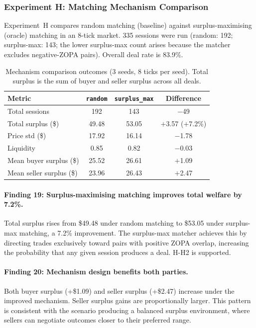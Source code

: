 \subsubsection{Experiment H: Matching Mechanism Comparison}
\label{sec:results-mechanism}

Experiment~H compares random matching (baseline) against surplus-maximising (oracle) matching in an 8-tick market.  335 sessions were run (random: 192; surplus-max: 143; the lower surplus-max count arises because the matcher excludes negative-ZOPA pairs).  Overall deal rate is 83.9\%.

\begin{table}[ht]
\centering
\caption{Mechanism comparison outcomes (3 seeds, 8 ticks per seed).  Total surplus is the sum of buyer and seller surplus across all deals.}
\label{tab:mechanism}
\begin{tabular}{@{}lccc@{}}
\toprule
Metric & \texttt{random} & \texttt{surplus\_max} & Difference \\
\midrule
Total sessions           & 192     & 143     & $-$49 \\
Total surplus (\$)       & 49.48   & 53.05   & $+$3.57 ($+$7.2\%) \\
Price std (\$)           & 17.92   & 16.14   & $-$1.78 \\
Liquidity                & 0.85    & 0.82    & $-$0.03 \\
Mean buyer surplus (\$)  & 25.52   & 26.61   & $+$1.09 \\
Mean seller surplus (\$) & 23.96   & 26.43   & $+$2.47 \\
\bottomrule
\end{tabular}
\end{table}

\paragraph{Finding 19: Surplus-maximising matching improves total welfare by 7.2\%.}
Total surplus rises from \$49.48 under random matching to \$53.05 under surplus-max matching, a 7.2\% improvement.  The surplus-max matcher achieves this by directing trades exclusively toward pairs with positive ZOPA overlap, increasing the probability that any given session produces a deal.  H-H2 is supported.

\paragraph{Finding 20: Mechanism design benefits both parties.}
Both buyer surplus (+\$1.09) and seller surplus (+\$2.47) increase under the improved mechanism.  Seller surplus gains are proportionally larger.  This pattern is consistent with the scenario producing a balanced surplus environment, where sellers can negotiate outcomes closer to their preferred range.

